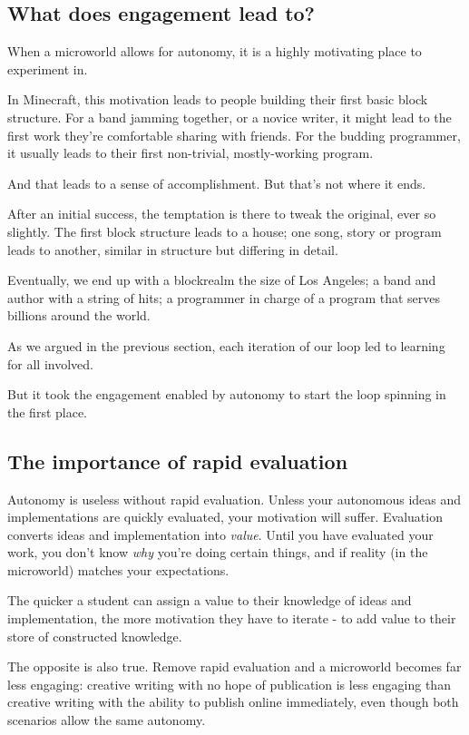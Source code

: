 \subsection{What does engagement lead to?}

When a microworld allows for autonomy, it is a highly motivating place
to experiment in.

In Minecraft, this motivation leads to people building their first basic
block structure. For a band jamming together, or a novice writer, it
might lead to the first work they're comfortable sharing with friends.
For the budding programmer, it usually leads to their first non-trivial,
mostly-working program.

And that leads to a sense of accomplishment. But that's not where it
ends.

After an initial success, the temptation is there to tweak the original,
ever so slightly. The first block structure leads to a house; one song,
story or program leads to another, similar in structure but differing in
detail.

Eventually, we end up with a blockrealm the size of Los Angeles; a band
and author with a string of hits; a programmer in charge of a program
that serves billions around the world.

As we argued in the previous section, each iteration of our loop led to
learning for all involved.

But it took the engagement enabled by autonomy to start the loop
spinning in the first place.

\subsection{The importance of rapid evaluation}

Autonomy is useless without rapid evaluation. Unless your autonomous ideas and implementations are quickly evaluated, your motivation will suffer\cite{drive}. Evaluation converts ideas and implementation into \emph{value}. Until you have evaluated your work, you don't know \emph{why} you're doing certain things, and if reality (in the microworld) matches your expectations. 

The quicker a student can assign a value to their knowledge of ideas and implementation, the more motivation they have to iterate - to add value to their store of constructed knowledge.

The opposite is also true. Remove rapid evaluation and a microworld becomes far less engaging: creative writing with no hope of publication is less engaging than creative writing with the ability to publish online immediately, even though both scenarios allow the same autonomy.  
